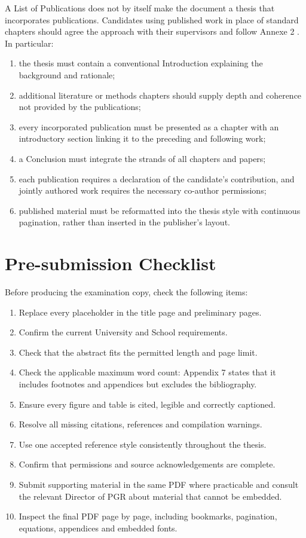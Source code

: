 \documentclass[oneside,header=auto]{liverpoolthesis}
\begin{document}
A List of Publications does not by itself make the document a thesis that incorporates publications. Candidates using published work in place of standard chapters should agree the approach with their supervisors and follow Annexe 2 \citep{uolpublications}. In particular:

\begin{enumerate}
  \item the thesis must contain a conventional Introduction explaining the
        background and rationale;
  \item additional literature or methods chapters should supply depth and
        coherence not provided by the publications;
  \item every incorporated publication must be presented as a chapter with an
        introductory section linking it to the preceding and following work;
  \item a Conclusion must integrate the strands of all chapters and papers;
  \item each publication requires a declaration of the candidate's contribution,
        and jointly authored work requires the necessary co-author permissions;
  \item published material must be reformatted into the thesis style with
        continuous pagination, rather than inserted in the publisher's layout.
\end{enumerate}

\chapter{Pre-submission Checklist}

Before producing the examination copy, check the following items:

\begin{enumerate}
  \item Replace every placeholder in the title page and preliminary pages.
  \item Confirm the current University and School requirements.
  \item Check that the abstract fits the permitted length and page limit.
  \item Check the applicable maximum word count: Appendix 7 states that it
        includes footnotes and appendices but excludes the bibliography.
  \item Ensure every figure and table is cited, legible and correctly captioned.
  \item Resolve all missing citations, references and compilation warnings.
  \item Use one accepted reference style consistently throughout the thesis.
  \item Confirm that permissions and source acknowledgements are complete.
  \item Submit supporting material in the same PDF where practicable and consult
        the relevant Director of PGR about material that cannot be embedded.
  \item Inspect the final PDF page by page, including bookmarks, pagination,
        equations, appendices and embedded fonts.
\end{enumerate}
\end{document}
